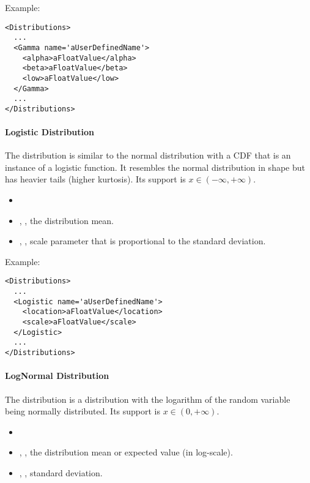 Example:
\begin{lstlisting}[style=XML]
<Distributions>
  ...
  <Gamma name='aUserDefinedName'>
    <alpha>aFloatValue</alpha>
    <beta>aFloatValue</beta>
    <low>aFloatValue</low>
  </Gamma>
  ...
</Distributions>
\end{lstlisting}

\paragraph{Logistic Distribution}
\label{Logistic}
The  distribution is similar to the
normal distribution with a CDF that is an instance of a logistic function.
%
It resembles the normal distribution in shape but has heavier tails (higher
kurtosis).
%
Its support is $x \in (-\infty,+\infty)$.

%
\attrIntro
\vspace{-5mm}
\begin{itemize}
  \itemsep0em
  \item \nameDescription
\end{itemize}
\vspace{-5mm}
\subnodesIntro
\begin{itemize}
  \item {}, , the
  distribution
  mean.
  \item {}, , scale parameter
  that
  is proportional to the standard deviation.
\end{itemize}

Example:
\begin{lstlisting}[style=XML]
<Distributions>
  ...
  <Logistic name='aUserDefinedName'>
    <location>aFloatValue</location>
    <scale>aFloatValue</scale>
  </Logistic>
  ...
</Distributions>
\end{lstlisting}

\paragraph{LogNormal Distribution}
\label{LogNormal}
The  distribution is a distribution with the
logarithm of the random variable being normally distributed.
%
Its support is $x \in (0, +\infty)$.

%
\attrIntro
\vspace{-5mm}
\begin{itemize}
  \itemsep0em
  \item \nameDescription
\end{itemize}
\vspace{-5mm}
\subnodesIntro
\begin{itemize}
  \item {}, , the distribution
  mean or expected value (in log-scale).
  \item {}, , standard
  deviation.
\end{itemize}

